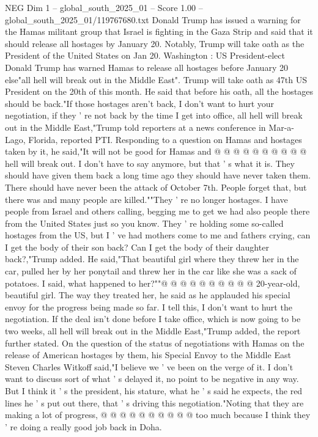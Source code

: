 \begin{textsample}{NEG Dim 1 – global\_south\_2025\_01 – Score 1.00 – global\_south\_2025\_01/119767680.txt}  \label{ex:f1_neg_156}
Donald Trump has issued a warning for the Hamas militant group that Israel is fighting in the Gaza Strip and said that it should release all hostages by January 20.
Notably, Trump will take oath as the President of the United States on Jan 20.
Washington : US President-elect Donald Trump has warned Hamas to release all hostages before January 20 else"all hell will break out in the Middle East".
Trump will take oath as 47th US President on the 20th of this month.
He said that before his oath, all the hostages should be back."If those hostages aren't back, I don't want to hurt your negotiation, if they ' re not back by the time I get into office, all hell will break out in the Middle East,"Trump told reporters at a news conference in Mar-a-Lago, Florida, reported PTI.
Responding to a question on Hamas and hostages taken by it, he said,"It will not be good for Hamas and @ @ @ @ @ @ @ @ @ @ hell will break out.
I don't have to say anymore, but that ' s what it is.
They should have given them back a long time ago they should have never taken them.
There should have never been the attack of October 7th.
People forget that, but there was and many people are killed.""They ' re no longer hostages.
I have people from Israel and others calling, begging me to get we had also people there from the United States just so you know.
They ' re holding some so-called hostages from the US, but I ' ve had mothers come to me and fathers crying, can I get the body of their son back?
Can I get the body of their daughter back?,"Trump added.
He said,"That beautiful girl where they threw her in the car, pulled her by her ponytail and threw her in the car like she was a sack of potatoes.
I said, what happened to her?""@ @ @ @ @ @ @ @ @ @ 20-year-old, beautiful girl.
The way they treated her, he said as he applauded his special envoy for the progress being made so far.
I tell this, I don't want to hurt the negotiation.
If the deal isn't done before I take office, which is now going to be two weeks, all hell will break out in the Middle East,"Trump added, the report further stated.
On the question of the status of negotiations with Hamas on the release of American hostages by them, his Special Envoy to the Middle East Steven Charles Witkoff said,"I believe we ' ve been on the verge of it.
I don't want to discuss sort of what ' s delayed it, no point to be negative in any way.
But I think it ' s the president, his stature, what he ' s said he expects, the red lines he ' s put out there, that ' s driving this negotiation."Noting that they are making a lot of progress, @ @ @ @ @ @ @ @ @ @ too much because I think they ' re doing a really good job back in Doha.

\end{textsample}
